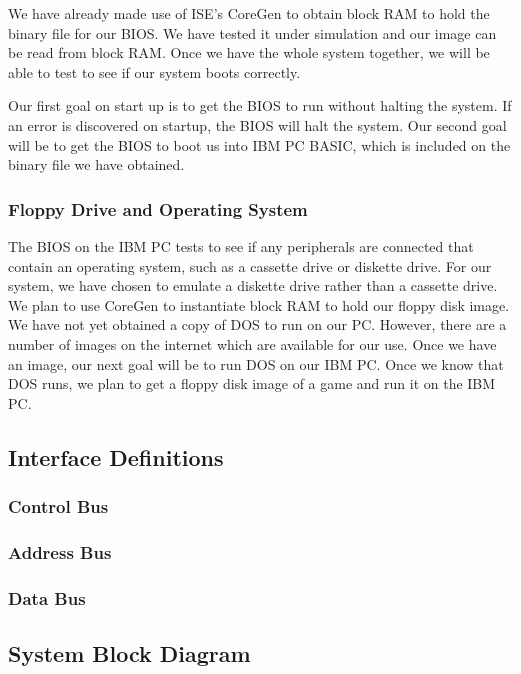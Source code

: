 \documentclass[12pt, letterpaper]{article}
\begin{document}
    We have already made use of ISE’s CoreGen to obtain block RAM to hold the binary file for our BIOS. We have tested it under simulation and our image can be read from block RAM. Once we have the whole system together, we will be able to test to see if our system boots correctly. 
        
    Our first goal on start up is to get the BIOS to run without halting the system. If an error is discovered on startup, the BIOS will halt the system. Our second goal will be to get the BIOS to boot us into IBM PC BASIC, which is included on the binary file we have obtained. 

\subsubsection{Floppy Drive and Operating System}

            The BIOS on the IBM PC tests to see if any peripherals are connected that contain an operating system, such as a cassette drive or diskette drive. For our system, we have chosen to emulate a diskette drive rather than a cassette drive. We plan to use CoreGen to instantiate block RAM to hold our floppy disk image. We have not yet obtained a copy of DOS to run on our PC. However, there are a number of images on the internet which are available for our use. Once we have an image, our next goal will be to run DOS on our IBM PC. Once we know that DOS runs, we plan to get a floppy disk image of a game and run it on the IBM PC. 

\subsection{Interface Definitions}

\subsubsection{Control Bus}

\subsubsection{Address Bus}

\subsubsection{Data Bus}

\subsection{System Block Diagram}
\end{document}
